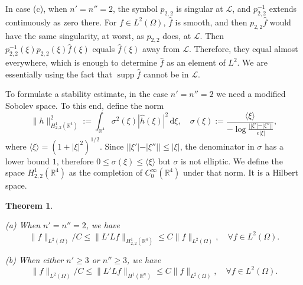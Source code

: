 \documentclass[11pt]{amsart}
\newtheorem{theorem}{Theorem}[section]
\theoremstyle{definition}
\theoremstyle{remark}
\numberwithin{equation}{section}
\newcommand{\rb}{\mathbb{R}}
\renewcommand{\d}{\,\mathrm{d}}
\DeclareMathOperator{\supp}{supp}
\begin{document}
In case (c), when $n'=n''=2$, the symbol $p_{2,2}$ is singular at $\mathcal{L}$, and $p_{2,2}^{-1}$ extends continuously as zero there. For $f\in L^2(\Omega)$, $\hat f$ is smooth, and then $p_{2,2}\hat f$ would have the same singularity, at worst, as $p_{2,2}$ does, at $\mathcal L$. Then $ p_{2,2}^{-1}(\xi) p_{2,2}(\xi)\hat f(\xi)$ equals $\hat f(\xi)$ away from $\mathcal{L}$. Therefore, they equal almost everywhere, which is enough to determine $\hat f$ as an element of $L^2$. We are essentially using the fact that $\supp \hat f$ cannot be in $\mathcal L$. 

To formulate a stability estimate, in the case $n'=n''=2$ we need a modified Sobolev space. To this end, define the norm
\[
 \|h\|_{H_{2,2}^1(\rb^4)}^2:= \int_{\rb^4}\sigma^2(\xi)|\hat h(\xi)|^2\d\xi, \quad \sigma(\xi):=   \frac{\langle \xi\rangle }{-\log\frac{||\xi'|-|\xi''| |}{e|\xi|}},
\]
where $\langle \xi \rangle = (1+|\xi|^2)^{1/2}$. Since $||\xi'|-|\xi''| |\le |\xi|$, the denominator in $\sigma$ has a lower bound $1$, therefore $0\le\sigma(\xi)\le \langle \xi\rangle$ but $\sigma$ is not elliptic. We define the space $H_{2,2}^1(\rb^4)$ as the completion of $C_0^\infty(\rb^4)$ under that norm. It is a Hilbert space. 

\begin{theorem} 
	\ 
	
	(a) When $n'=n''=2$, we have 
	\begin{equation}   \label{st1}
	\|f\|_{L^2(\Omega)}/C \le \|L'Lf\|_{H^1_{2,2}(\rb^4)} \le C \|f\|_{L^2(\Omega)},\quad \forall f\in L^2(\Omega). 
	\end{equation}
	
	(b)  When either $n'\ge3$ or $n''\ge3$, we have
	\begin{equation}   \label{st2}
		\|f\|_{L^2(\Omega)}/C \le \|L'Lf\|_{H^1(\rb^n)} \le C \|f\|_{L^2(\Omega)},\quad \forall f\in L^2(\Omega).
	\end{equation}
\end{theorem}
\end{document}
